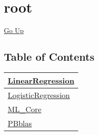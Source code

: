 \chapter*{\color{headtoc} root}
\hypertarget{ecldoc:toc:root}{}
\hyperlink{ecldoc:toc:}{Go Up}


\section*{Table of Contents}
{\renewcommand{\arraystretch}{1.5}
\begin{longtable}{|p{\textwidth}|}
\hline
\hyperlink{ecldoc:toc:root/LinearRegression}{LinearRegression} \\
\hline
\hyperlink{ecldoc:toc:root/LogisticRegression}{LogisticRegression} \\
\hline
\hyperlink{ecldoc:toc:root/ML_Core}{ML\_Core} \\
\hline
\hyperlink{ecldoc:toc:root/PBblas}{PBblas} \\
\hline
\end{longtable}
}





